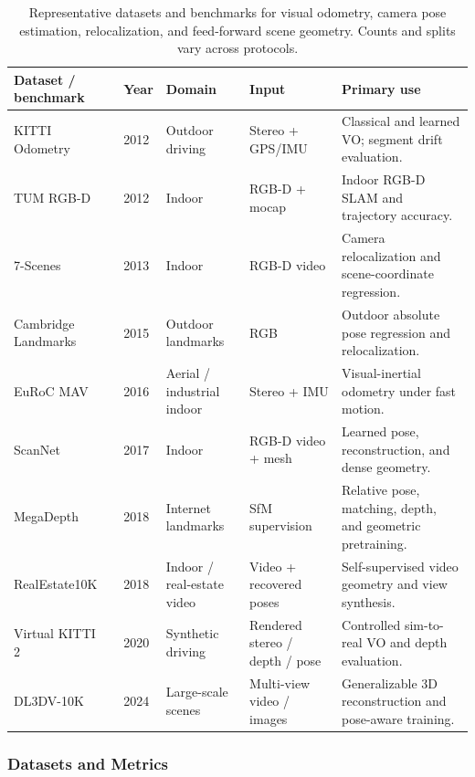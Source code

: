\begin{table}[!t]
\centering
\caption{Representative datasets and benchmarks for visual odometry, camera pose estimation, relocalization, and feed-forward scene geometry. Counts and splits vary across protocols.}
\label{tab:vo_pose_datasets}
\fontsize{9}{11}\selectfont
\setlength{\tabcolsep}{4pt}
\begin{tabular}{L{0.15\textwidth}C{0.1\textwidth} C{0.15\textwidth}C{0.15\textwidth}L{0.35\textwidth}}
\toprule
\textbf{Dataset / benchmark} & \textbf{Year} & \textbf{Domain} & \textbf{Input} & \textbf{Primary use} \\
\midrule
KITTI Odometry~\cite{KITTI-GeigerLU12} & 2012 & Outdoor driving & Stereo + GPS/IMU & Classical and learned VO; segment drift evaluation. \\
TUM RGB-D~\cite{Sturm2012TUMRGBD} & 2012 & Indoor & RGB-D + mocap & Indoor RGB-D SLAM and trajectory accuracy. \\
7-Scenes~\cite{Scene_Coordinate} & 2013 & Indoor & RGB-D video & Camera relocalization and scene-coordinate regression. \\
Cambridge Landmarks~\cite{kendall2015posenet} & 2015 & Outdoor landmarks & RGB & Outdoor absolute pose regression and relocalization. \\
EuRoC MAV~\cite{Burri2016EuRoC} & 2016 & Aerial / industrial indoor & Stereo + IMU & Visual-inertial odometry under fast motion. \\
ScanNet~\cite{dai2017scannet} & 2017 & Indoor & RGB-D video + mesh & Learned pose, reconstruction, and dense geometry. \\
MegaDepth~\cite{li2018megadepth} & 2018 & Internet landmarks & SfM supervision & Relative pose, matching, depth, and geometric pretraining. \\
RealEstate10K~\cite{zhou2018stereo} & 2018 & Indoor / real-estate video & Video + recovered poses & Self-supervised video geometry and view synthesis. \\
Virtual KITTI 2~\cite{Cabon2020VirtualKITTI2} & 2020 & Synthetic driving & Rendered stereo / depth / pose & Controlled sim-to-real VO and depth evaluation. \\
DL3DV-10K~\cite{ling2024dl3dv} & 2024 & Large-scale scenes & Multi-view video / images & Generalizable 3D reconstruction and pose-aware training. \\
\bottomrule
\end{tabular}
\end{table}

\subsubsection{Datasets and Metrics}
\label{sec:vo_datasets}

